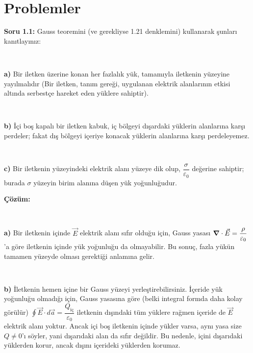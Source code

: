 \newpage
\section{Problemler}


\begin{flushleft}
   
\textbf{Soru 1.1:} Gauss teoremini (ve gerekliyse 1.21 denklemini) kullanarak şunları kanıtlayınız:

\

\textbf{a)} Bir iletken üzerine konan her fazlalık yük, tamamıyla iletkenin yüzeyine yayılmalıdır (Bir iletken, tanım gereği, uygulanan elektrik alanlarının etkisi altında serbestçe hareket eden yüklere sahiptir).

\

\textbf{b)} İçi boş kapalı bir iletken kabuk, iç bölgeyi dışardaki yüklerin alanlarına karşı perdeler; fakat dış bölgeyi içeriye konacak yüklerin alanlarına karşı perdeleyemez.

\

\textbf{c)} Bir iletkenin yüzeyindeki elektrik alanı yüzeye dik olup, $\dfrac{\sigma}{\varepsilon_{0}}$ değerine sahiptir; burada $\sigma$ yüzeyin birim alanına düşen yük yoğunluğudur.
\end{flushleft}

  
\textbf{Çözüm:}

\


\textbf{a)} Bir iletkenin içinde $\Vec{E}$ elektrik alanı sıfır olduğu için, Gauss yasası $\grad \cdot \Vec{E} = \dfrac{\rho}{\varepsilon_{0}}$'a göre iletkenin içinde yük yoğunluğu da olmayabilir. Bu sonuç, fazla yükün tamamen yüzeyde olması gerektiği anlamına gelir.

\

\textbf{b)} İletkenin hemen içine bir Gauss yüzeyi yerleştirebilirsiniz. İçeride yük yoğunluğu olmadığı için, Gauss yasasına göre (belki integral formda daha kolay görülür) $\oint \Vec{E} \cdot d\Vec{a} = \dfrac{Q_{\textrm{iç}}}{ \varepsilon_{0}}$ iletkenin dışındaki tüm yüklere rağmen içeride de $\Vec{E}$ elektrik alanı yoktur. Ancak içi boş iletkenin içinde yükler varsa, aynı yasa size $Q \neq 0$'ı söyler, yani dışarıdaki alan da sıfır değildir. Bu nedenle, içini dışarıdaki yüklerden korur, ancak dışını içerideki yüklerden korumaz.

\ 


